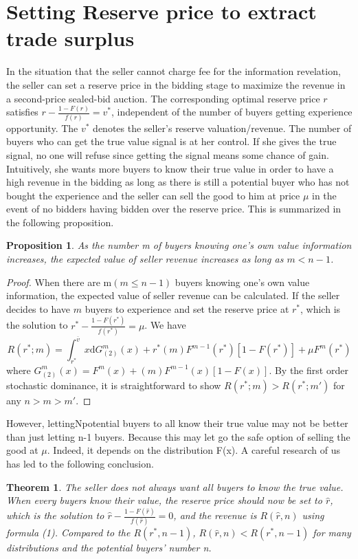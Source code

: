 \documentclass[review]{elsarticle}
\newtheorem{thm}{Theorem}
\newtheorem{prop}{Proposition}
\begin{document}
\section{Setting Reserve price to extract trade surplus}
In the situation that the seller cannot charge fee for the information
revelation,  the seller can set a reserve price in the bidding stage to maximize the
revenue in a second-price sealed-bid auction. The corresponding
optimal reserve price $r$ satisfies $r - \frac{1 - F(r)}{f(r)}
= v^*$, independent of the number of buyers getting experience
opportunity. The $v^*$ denotes the seller's reserve valuation/revenue. 
 The number of buyers who can get the true value signal is at her control. If she gives the true
signal, no one will refuse since getting the signal means some chance
of gain. Intuitively, she 
wants more buyers to know their true value in order to have a high
revenue in the bidding as long as there is still a potential buyer who
has not bought the experience and the seller can sell the good to him
at price $\mu$ in the event of no bidders having bidden over the
reserve price. This is summarized in the following proposition.
\begin{prop}
 As the number m of buyers knowing one's own value information increases, the expected value of seller revenue increases as long as $m<n-1$.
\end{prop}
\begin{proof}
When there are m$(m\leq n-1)$ buyers knowing one's own value information, the expected value of seller revenue can be calculated.
If the seller decides to have $m$ buyers to experience and set the
reserve price at $r^*$, which is the solution to $r^*-\frac{1 - F(r^*)}{f(r^*)}=\mu$. We have
\begin{equation}
R(r^* ;m) =  \int_{r^*}^{\overline{v}}x\mathrm{d}G_{(2)}^{m}(x) +
r^*(m)F^{m-1}(r^*)[1 - F(r^*)] + \mu F^{m}(r^*)
\end{equation}
where $G_{(2)}^{m}(x) = F^{m}(x) + (m)F^{m-1}(x)[1 -  F(x)]$.
 By the first order stochastic dominance, it is straightforward to show $R(r^*;m) > R(r^*;m')$ for any $n>m>m'$.
\end{proof}
However, lettingNpotential buyers to all know their true value may
not be better than just letting n-1 buyers. Because this may let go the
safe option of selling the good at $\mu$. Indeed, it depends on the
distribution F(x). A careful research of us has led to the following conclusion.
\begin{thm}
  The seller does not always want all buyers to know the true value. 
 When every buyers know their value, 
 the reserve price should now be set to $\hat{r}$, which is the solution to $\hat{r}-\frac{1 - F(\hat{r})}{f(\hat{r})}=0$, and the revenue is $R(\hat{r},n)$ using formula (1). Compared to the $R(r^*,n-1)$,
 $R(\hat{r},n)<R(r^*,n-1)$ for many distributions and the potential buyers' number n.
 \end{thm}
\end{document}
